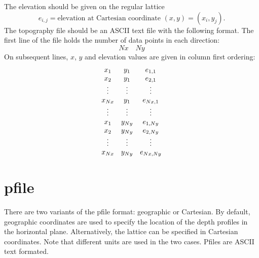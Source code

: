 \documentclass[11pt]{report}
\begin{document}
The elevation should be given on the regular lattice
\[
e_{i,j} = \mbox{elevation at Cartesian coordinate $(x,y)=(x_i, y_j)$.}
\]
The topography file should be an ASCII text file with the following format. The first line of the
file holds the number of data points in each direction:
\[
Nx\quad Ny
\]
On subsequent lines, $x$, $y$ and elevation values are given in column first ordering:
\[
\begin{array}{c c c}
x_1 & y_1& e_{1,1}\\
x_2& y_1& e_{2,1}\\
\vdots&\vdots&\vdots\\
x_{Nx}& y_1& e_{Nx,1}\\
\vdots&\vdots&\vdots\\
x_1 & y_{Ny}& e_{1,Ny}\\
x_2& y_{Ny}& e_{2,Ny}\\
\vdots&\vdots&\vdots\\
x_{Nx}& y_{Ny}& e_{Nx,Ny}
\end{array}
\]

\section{pfile}\label{sec:pfile-format}

There are two variants of the pfile format: geographic or Cartesian. By default, geographic
coordinates are used to specify the location of the depth profiles in the horizontal
plane. Alternatively, the lattice can be specified in Cartesian coordinates. Note that different
units are used in the two cases. Pfiles are ASCII text formated.
\end{document}
